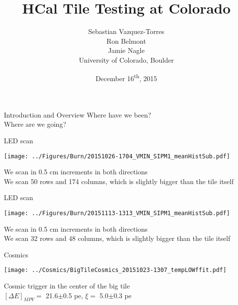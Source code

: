 \documentclass[compress,8pt]{beamer} %
\title[Dec 16, 2015 - Slide \insertframenumber]{HCal Tile Testing at Colorado}
\author[CU-Boulder]{Sebastian Vazquez-Torres \\  Ron Belmont \\ Jamie Nagle \\ \vspace{20pt} University of Colorado, Boulder}
\date{December 16\textsuperscript{th}, 2015}
\begin{document}
\begin{frame}
\titlepage
\end{frame}





\begin{frame}{Introduction and Overview}
Where have we been? \\
Where are we going? \\
\end{frame}




\begin{frame}{LED scan}
\begin{adjustwidth}{-3em}{-3em}
\begin{center}
\texttt{[image: ../Figures/Burn/20151026-1704\_VMIN\_SIPM1\_meanHistSub.pdf]}
\end{center}
\end{adjustwidth}
We scan in 0.5 cm increments in both directions \\
We scan 50 rows and 174 columns, which is slightly bigger than the tile itself
\end{frame}




\begin{frame}{LED scan}
\begin{adjustwidth}{-3em}{-3em}
\begin{center}
\texttt{[image: ../Figures/Burn/20151113-1313\_VMIN\_SIPM1\_meanHistSub.pdf]}
\end{center}
\end{adjustwidth}
We scan in 0.5 cm increments in both directions \\
We scan 32 rows and 48 columns, which is slightly bigger than the tile itself
\end{frame}




\begin{frame}{Cosmics}
\begin{adjustwidth}{-3em}{-3em}
\begin{center}
\texttt{[image: ../Cosmics/BigTileCosmics\_20151023-1307\_tempLOWffit.pdf]}
\end{center}
\end{adjustwidth}
\vspace{-10pt}
Cosmic trigger in the center of the big tile \\
$[\Delta E]_{MPV} =$ 21.6$\pm$0.5 pe, $\xi =$ 5.0$\pm$0.3 pe \\
\end{frame}
\end{document}
